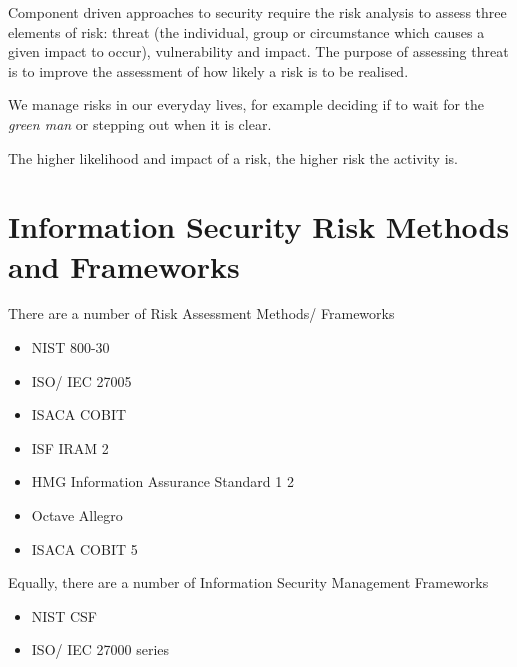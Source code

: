 
Component driven approaches to security require the risk analysis to assess three elements of risk: threat (the individual, group or circumstance which causes a given impact to occur), vulnerability and impact. The purpose of assessing threat is to improve the assessment of how likely a risk is to be realised.

We manage risks in our everyday lives, for example deciding if to wait for the \textit{green man} or stepping out when it is clear.

The higher likelihood and impact of a risk, the higher risk the activity is. 

\section*{Information Security Risk Methods and Frameworks}
There are a number of Risk Assessment Methods/ Frameworks
\begin{itemize}
    \item NIST 800-30
    \item ISO/ IEC 27005
    \item ISACA COBIT
    \item ISF IRAM 2
    \item HMG Information Assurance Standard 1 2
    \item Octave Allegro
    \item ISACA COBIT 5
\end{itemize}
Equally, there are a number of Information Security Management Frameworks
\begin{itemize}
    \item NIST CSF
    \item ISO/ IEC 27000 series
\end{itemize}


